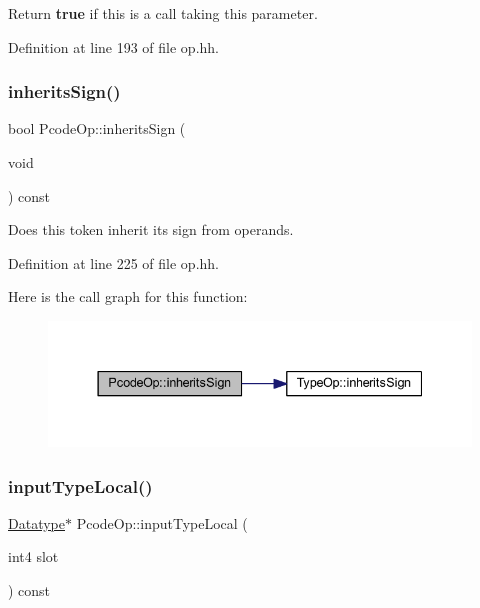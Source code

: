 Return {\bfseries{true}} if this is a call taking \textquotesingle{}this\textquotesingle{} parameter. 



Definition at line 193 of file op.\+hh.

\mbox{\label{class_pcode_op_a9771335d96b658139c359db91a6825be}} 
\subsubsection{\texorpdfstring{inheritsSign()}{inheritsSign()}}
{\footnotesize\ttfamily bool Pcode\+Op\+::inherits\+Sign (\begin{DoxyParamCaption}\item[{void}]{ }\end{DoxyParamCaption}) const\hspace{0.3cm}{\ttfamily [inline]}}



Does this token inherit its sign from operands. 



Definition at line 225 of file op.\+hh.

Here is the call graph for this function\+:
\nopagebreak
\begin{figure}[H]
\begin{center}
\leavevmode
\includegraphics[width=337pt]{class_pcode_op_a9771335d96b658139c359db91a6825be_cgraph}
\end{center}
\end{figure}
\mbox{\label{class_pcode_op_a6e269b80886b90fc24b39f331e909c84}} 
\subsubsection{\texorpdfstring{inputTypeLocal()}{inputTypeLocal()}}
{\footnotesize\ttfamily \mbox{\hyperlink{class_datatype}{Datatype}}$\ast$ Pcode\+Op\+::input\+Type\+Local (\begin{DoxyParamCaption}\item[{int4}]{slot }\end{DoxyParamCaption}) const\hspace{0.3cm}{\ttfamily [inline]}}




